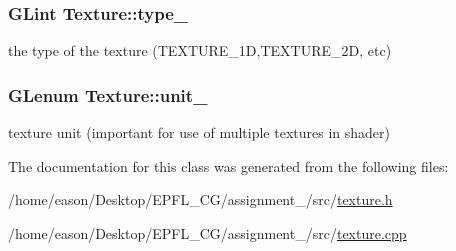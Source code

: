 \subsubsection[{\texorpdfstring{type\+\_\+}{type_}}]{\setlength{\rightskip}{0pt plus 5cm}G\+Lint Texture\+::type\+\_\+\hspace{0.3cm}{\ttfamily [private]}}\hypertarget{classTexture_ab3aecf31a2233f66cb9959f9e01884b2}{}\label{classTexture_ab3aecf31a2233f66cb9959f9e01884b2}


the type of the texture (T\+E\+X\+T\+U\+R\+E\+\_\+1D,T\+E\+X\+T\+U\+R\+E\+\_\+2D, etc) 

\subsubsection[{\texorpdfstring{unit\+\_\+}{unit_}}]{\setlength{\rightskip}{0pt plus 5cm}G\+Lenum Texture\+::unit\+\_\+\hspace{0.3cm}{\ttfamily [private]}}\hypertarget{classTexture_a6ac3d804ac4ef042b5fc0f2580a29ac8}{}\label{classTexture_a6ac3d804ac4ef042b5fc0f2580a29ac8}


texture unit (important for use of multiple textures in shader) 



The documentation for this class was generated from the following files\+:\begin{DoxyCompactItemize}
\item 
/home/eason/\+Desktop/\+E\+P\+F\+L\+\_\+\+C\+G/assignment\+\_/src/\hyperlink{texture_8h}{texture.\+h}\item 
/home/eason/\+Desktop/\+E\+P\+F\+L\+\_\+\+C\+G/assignment\+\_/src/\hyperlink{texture_8cpp}{texture.\+cpp}\end{DoxyCompactItemize}
